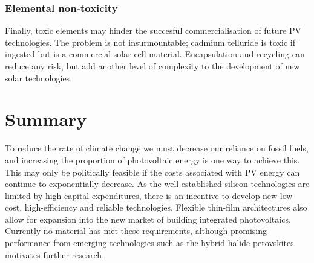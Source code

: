 \subsubsection{Elemental non-toxicity}
Finally, toxic elements may hinder the succesful commercialisation of future PV technologies. The problem is not insurmountable; cadmium telluride is toxic if ingested but is a commercial solar cell material. Encapsulation and recycling can reduce any risk, but add another level of complexity to the development of new solar technologies.

\section{Summary}

To reduce the rate of climate change we must decrease our reliance on fossil fuels, and increasing the proportion of photovoltaic energy is one way to achieve this. This may only be politically feasible if the costs associated with PV energy can continue to exponentially decrease. As the well-established silicon technologies are limited by high capital expenditures, there is an incentive to develop new low-cost, high-efficiency and reliable technologies. Flexible thin-film architectures also allow for expansion into the new market of building integrated photovoltaics. Currently no material has met these requirements,\autocite{Zakutayev2017} although promising performance from emerging technologies such as the hybrid halide perovskites motivates further research.




